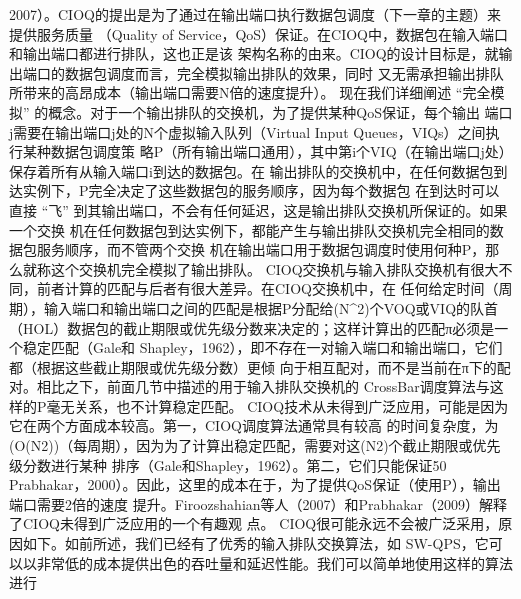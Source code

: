 2007）。CIOQ的提出是为了通过在输出端口执行数据包调度（下一章的主题）来提供服务质量
（Quality of Service，QoS）保证。在CIOQ中，数据包在输入端口和输出端口都进行排队，这也正是该
架构名称的由来。CIOQ的设计目标是，就输出端口的数据包调度而言，完全模拟输出排队的效果，同时
又无需承担输出排队所带来的高昂成本（输出端口需要N倍的速度提升）。
现在我们详细阐述 “完全模拟” 的概念。对于一个输出排队的交换机，为了提供某种QoS保证，每个输出
端口j需要在输出端口j处的N个虚拟输入队列（Virtual Input Queues，VIQs）之间执行某种数据包调度策
略P（所有输出端口通用），其中第i个VIQ（在输出端口j处）保存着所有从输入端口i到达的数据包。在
输出排队的交换机中，在任何数据包到达实例下，P完全决定了这些数据包的服务顺序，因为每个数据包
在到达时可以直接 “飞” 到其输出端口，不会有任何延迟，这是输出排队交换机所保证的。如果一个交换
机在任何数据包到达实例下，都能产生与输出排队交换机完全相同的数据包服务顺序，而不管两个交换
机在输出端口用于数据包调度时使用何种P，那么就称这个交换机完全模拟了输出排队。
CIOQ交换机与输入排队交换机有很大不同，前者计算的匹配与后者有很大差异。在CIOQ交换机中，在
任何给定时间（周期），输入端口和输出端口之间的匹配是根据P分配给(N^{2})个VOQ或VIQ的队首
（HOL）数据包的截止期限或优先级分数来决定的；这样计算出的匹配π必须是一个稳定匹配（Gale和
Shapley，1962），即不存在一对输入端口和输出端口，它们都（根据这些截止期限或优先级分数）更倾
向于相互配对，而不是当前在π下的配对。相比之下，前面几节中描述的用于输入排队交换机的
CrossBar调度算法与这样的P毫无关系，也不计算稳定匹配。
CIOQ技术从未得到广泛应用，可能是因为它在两个方面成本较高。第一，CIOQ调度算法通常具有较高
的时间复杂度，为(O(N{2}))（每周期），因为为了计算出稳定匹配，需要对这(N{2})个截止期限或优先级分数进行某种
排序（Gale和Shapley，1962）。第二，它们只能保证50%
Prabhakar，2000）。因此，这里的成本在于，为了提供QoS保证（使用P），输出端口需要2倍的速度
提升。Firoozshahian等人（2007）和Prabhakar（2009）解释了CIOQ未得到广泛应用的一个有趣观
点。
CIOQ很可能永远不会被广泛采用，原因如下。如前所述，我们已经有了优秀的输入排队交换算法，如
SW-QPS，它可以以非常低的成本提供出色的吞吐量和延迟性能。我们可以简单地使用这样的算法进行

